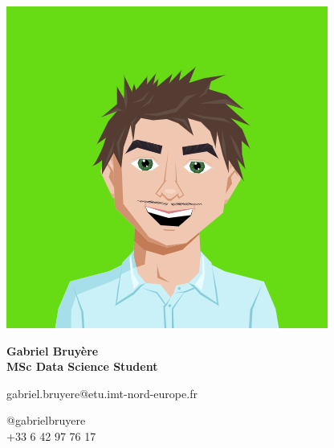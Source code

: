 \documentclass{article}
\begin{document}
\centering \includegraphics[width=.2\linewidth]{hero.png}\\[1pt]
\parbox{2in}{\Large \centering \textbf{Gabriel Bruyère}\\[1pt]
\normalsize \textbf{MSc Data Science Student}}

\vfill
\raggedright
\begin{multicols}{2}
gabriel.bruyere@etu.imt-nord-europe.fr

\columnbreak
\raggedleft
@gabrielbruyere\\
+33 6 42 97 76 17%
\end{multicols}%
\end{document}
